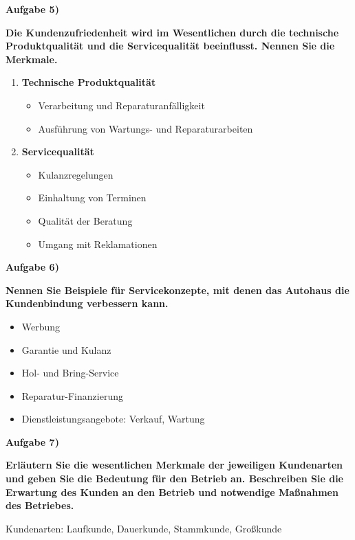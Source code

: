 \textbf{Aufgabe 5)}

\textbf{Die Kundenzufriedenheit wird im Wesentlichen durch die
technische Produktqualität und die Servicequalität beeinflusst. Nennen
Sie die Merkmale.}

\begin{enumerate}
\item
  \textbf{Technische Produktqualität}

  \begin{itemize}
  \item
    Verarbeitung und Reparaturanfälligkeit
  \item
    Ausführung von Wartungs- und Reparaturarbeiten
  \end{itemize}
\item
  \textbf{Servicequalität}

  \begin{itemize}
  \item
    Kulanzregelungen
  \item
    Einhaltung von Terminen
  \item
    Qualität der Beratung
  \item
    Umgang mit Reklamationen
  \end{itemize}
\end{enumerate}

\textbf{Aufgabe 6)}

\textbf{Nennen Sie Beispiele für Servicekonzepte, mit denen das Autohaus
die Kundenbindung verbessern kann.}

\begin{itemize}
\item
  Werbung
\item
  Garantie und Kulanz
\item
  Hol- und Bring-Service
\item
  Reparatur-Finanzierung
\item
  Dienstleistungsangebote: Verkauf, Wartung
\end{itemize}

\textbf{Aufgabe 7)}

\textbf{Erläutern Sie die wesentlichen Merkmale der jeweiligen
Kundenarten und geben Sie die Bedeutung für den Betrieb an. Beschreiben
Sie die Erwartung des Kunden an den Betrieb und notwendige Maßnahmen des
Betriebes.}

Kundenarten: Laufkunde, Dauerkunde, Stammkunde, Großkunde

